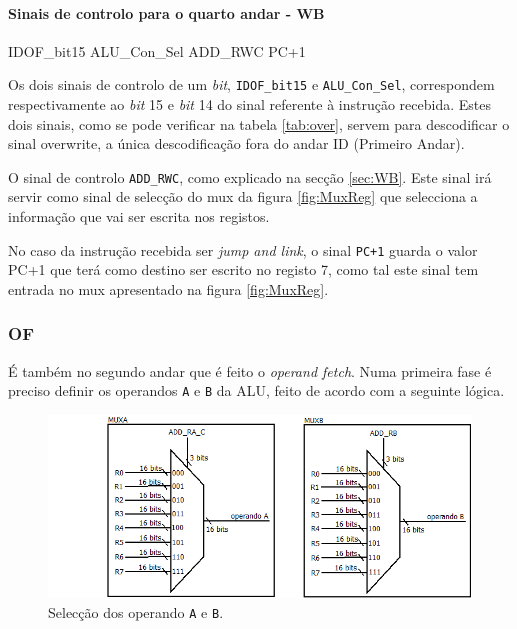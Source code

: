 \documentclass[11pt]{article}
\numberwithin{equation}{section}
\begin{document}
\paragraph{Sinais de controlo para o quarto andar - WB}
IDOF\_bit15 ALU\_Con\_Sel ADD\_RWC PC+1

Os dois sinais de controlo de um \textit{bit}, \texttt{IDOF\_bit15} e \texttt{ALU\_Con\_Sel}, correspondem respectivamente ao \textit{bit} 15 e \textit{bit} 14 do sinal referente à instrução recebida. Estes dois sinais, como se pode verificar na tabela \ref{tab:over}, servem para descodificar o sinal overwrite, a única descodificação fora do andar ID (Primeiro Andar).

O sinal de controlo \texttt{ADD\_RWC}, como explicado na secção \ref{sec:WB}. Este sinal irá servir como sinal de selecção do mux da figura \ref{fig:MuxReg} que selecciona a informação que vai ser escrita nos registos.
 
No caso da instrução recebida ser \textit{jump and link}, o sinal \texttt{PC+1} guarda o valor PC+1 que terá como destino ser escrito no registo 7, como tal este sinal tem entrada no mux apresentado na figura \ref{fig:MuxReg}.



\subsubsection{OF}

É também no segundo andar que é feito o \textit{operand fetch}. Numa primeira fase é preciso definir os operandos \texttt{A} e \texttt{B} da ALU, feito de acordo com a seguinte lógica.

\begin{figure}[H]
	\centering
	\includegraphics[keepaspectratio=true, scale=0.6]{imagens/OF1}
	\caption{Selecção dos operando \texttt{A} e \texttt{B}.}
	\vspace{-0.8em}
\end{figure}
\end{document}
